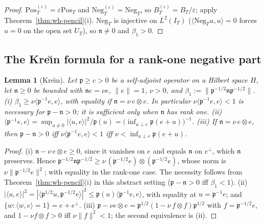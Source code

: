 \documentclass[11pt]{amsart}
\newtheorem{lemma}[theorem]{Lemma}
\theoremstyle{definition}
\theoremstyle{remark}
\newcommand{\IT}{I_T}
\begin{document}
\begin{proof}
$\mathrm{Pos}^{(\varepsilon)}_T=\varepsilon\mathrm{Pos}_T$ and $\mathrm{Neg}^{(\varepsilon)}_T=\mathrm{Neg}_T$, so
$B^{(\varepsilon)}_T=B_T/\varepsilon$; apply Theorem~\ref{thm:wh-pencil}(i). $\mathrm{Neg}_T$ is injective on $L^2(\IT)$
($\langle\mathrm{Neg}_Tu,u\rangle=0$ forces $\widehat u=0$ on the open set $U_T$), so $\mathfrak n\ne0$ and $\beta_1>0$.
\end{proof}

\subsection{The Kre\u{\i}n formula for a rank-one negative part}\label{subsec:wh-krein}

\begin{lemma}[Kre\u{\i}n]\label{lem:wh-krein}
Let $\mathfrak p\ge c>0$ be a self-adjoint operator on a Hilbert space $H$, let $\mathfrak n\ge0$ be bounded with
$\mathfrak ne=\nu e$, $\|e\|=1$, $\nu>0$, and $\beta_1:=\|\mathfrak p^{-1/2}\mathfrak n\mathfrak p^{-1/2}\|$.
\emph{(i)} $\beta_1\ge\nu\langle\mathfrak p^{-1}e,e\rangle$, with equality if $\mathfrak n=\nu\,e\otimes e$. In particular
$\nu\langle\mathfrak p^{-1}e,e\rangle<1$ is necessary for $\mathfrak p-\mathfrak n>0$; it is sufficient only when
$\mathfrak n$ has rank one.
\emph{(ii)} $\langle\mathfrak p^{-1}e,e\rangle=\sup_{u\ne0}|\langle u,e\rangle|^2/\mathfrak p(u)=\big(\inf_{u\perp e}\mathfrak p(e+u)\big)^{-1}$.
\emph{(iii)} If $\mathfrak n=\nu\,e\otimes e$, then $\mathfrak p-\mathfrak n>0$ iff $\nu\langle\mathfrak p^{-1}e,e\rangle<1$ iff
$\nu<\inf_{u\perp e}\mathfrak p(e+u)$.
\end{lemma}

\begin{proof}
(i) $\mathfrak n-\nu\,e\otimes e\ge0$, since it vanishes on $e$ and equals $\mathfrak n$ on $e^\perp$, which $\mathfrak n$
preserves. Hence $\mathfrak p^{-1/2}\mathfrak n\mathfrak p^{-1/2}\ge\nu\,(\mathfrak p^{-1/2}e)\otimes(\mathfrak p^{-1/2}e)$, whose norm is
$\nu\|\mathfrak p^{-1/2}e\|^2$; with equality in the rank-one case. The necessity follows from
Theorem~\ref{thm:wh-pencil}(i) in this abstract setting ($\mathfrak p-\mathfrak n>0$ iff $\beta_1<1$).
(ii) $|\langle u,e\rangle|^2=|\langle\mathfrak p^{1/2}u,\mathfrak p^{-1/2}e\rangle|^2\le\mathfrak p(u)\langle\mathfrak p^{-1}e,e\rangle$, with equality at
$u=\mathfrak p^{-1}e$; and $\{w:\langle w,e\rangle=1\}=e+e^\perp$. (iii) $\mathfrak p-\nu e\otimes e=\mathfrak p^{1/2}(1-\nu\,f\otimes f)\mathfrak p^{1/2}$ with
$f=\mathfrak p^{-1/2}e$, and $1-\nu f\otimes f>0$ iff $\nu\|f\|^2<1$; the second equivalence is (ii).
\end{proof}
\end{document}
